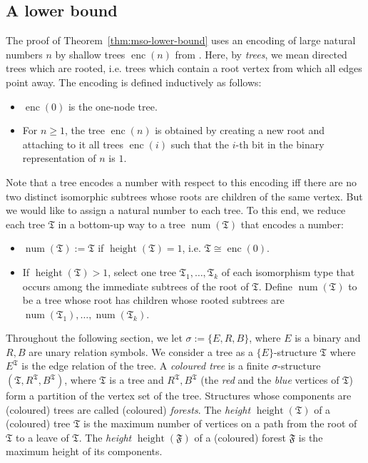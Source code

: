 \documentclass[11pt]{article}
\newcommand{\struct}[1]{\mathfrak{#1}}
\newcommand{\FS}{\struct{F}}
\newcommand{\TS}{\struct{T}}
\newcommand{\iso}{\cong}
\newcommand{\num}{\operatorname{num}}
\newcommand{\height}{\operatorname{height}}
\newcommand{\set}[1]{\{#1\}}
\newcommand{\enc}{\operatorname{enc}} \newcommand{\inc}{\textsc{inc}}
\begin{document}
\subsection{A lower bound}
\label{sec:lower-bounds}

The proof of Theorem~\ref{thm:mso-lower-bound} uses an encoding of large natural
numbers $n$ by shallow trees $\enc(n)$ from \cite[chapter 10.3]{FlumGrohe2004}.
Here, by \emph{trees}, we mean directed trees which are rooted, i.e. trees which
contain a root vertex from which all edges point away.  The encoding is defined
inductively as follows:
\begin{itemize}
\item $\enc(0)$ is the one-node tree.
\item For $n\geq 1$, the tree $\enc(n)$ is obtained by creating a new
  root and attaching to it all trees $\enc(i)$ such that the $i$-th
  bit in the binary representation of $n$ is $1$.
\end{itemize}
Note that a tree encodes a number with respect to this encoding iff there are no
two distinct isomorphic subtrees whose roots are children of the same
vertex. But we would like to assign a natural number to each tree. To this end,
we reduce each tree $\TS$ in a bottom-up way to a tree $\num(\TS)$ that encodes
a number:
\begin{itemize}
\item $\num(\TS):=\TS$ if $\height(\TS)=1$, i.e. $\TS\iso \enc(0)$.
\item If $\height(\TS) > 1$, select one tree $\TS_1, \ldots, \TS_k$ of each
  isomorphism type that occurs among the immediate subtrees of the root of
  $\TS$. Define $\num(\TS)$ to be a tree whose root has children whose rooted
  subtrees are $\num(\TS_1), \ldots, \num(\TS_k)$.  
\end{itemize}
Throughout the following section, we let $\sigma:=\set{E,R,B}$, where $E$ is a
binary and $R,B$ are unary relation symbols.  We consider a tree as a
$\set{E}$-structure $\TS$ where $E^\TS$ is the edge relation of the tree.  A
\emph{coloured tree} is a finite $\sigma$-structure $(\TS,R^\TS,B^\TS) $, where
$\TS$ is a tree and $R^\TS,B^\TS$ (the \emph{red} and the \emph{blue} vertices
of $\TS$) form a partition of the vertex set of the tree.  Structures whose
components are (coloured) trees are called (coloured) \emph{forests}.  The
\emph{height} $\height(\TS)$ of a (coloured) tree $\TS$ is the maximum number of
vertices on a path from the root of $\TS$ to a leave of $\TS$.  The
\emph{height} $\height(\FS)$ of a (coloured) forest $\FS$ is the maximum height
of its components.
\end{document}
